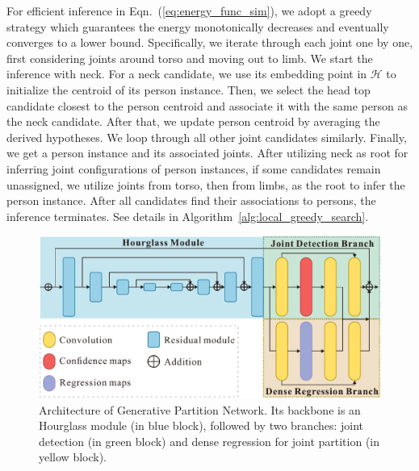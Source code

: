 \documentclass[10pt,twocolumn,letterpaper]{article}
\begin{document}
For efficient inference in Eqn.~(\ref{eq:energy_func_sim}), we adopt a greedy strategy which guarantees the energy monotonically decreases and eventually converges to a lower bound.
Specifically, we iterate through each joint one by one, first considering joints around  torso and  moving out to  limb. We start the inference with  neck.
For a  neck candidate, we use its embedding point in  $ \mathcal{H} $ to initialize the  centroid of its person instance.
Then, we select the head top candidate closest to the person centroid and associate it with the same person as the neck candidate.
After that, we update  person centroid  by averaging the derived hypotheses. We loop through all other joint candidates  similarly.
Finally,  we get a person instance and its associated joints.  After utilizing neck as root for inferring joint configurations of person instances, if some candidates remain unassigned,
we utilize joints from torso, then from limbs, as the root to infer the person instance.  After all candidates find their associations to persons, the inference terminates. See details in Algorithm~\ref{alg:local_greedy_search}.

\begin{figure}[t!]
\begin{center}
\includegraphics[scale=0.47]{figs/GPN_network_arch_3.pdf}
\caption{Architecture of Generative Partition Network.   Its backbone is an Hourglass module (in blue block), followed by two branches:  joint detection (in green block) and  dense regression for joint partition (in yellow block). %
}
\label{fig:gpn_network_arch}
\end{center}
\vspace{-20pt}
\end{figure}
\end{document}

